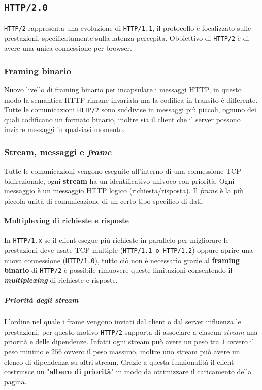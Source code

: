     \subsection{\texttt{HTTP/2.0}}
        \texttt{HTTP/2} rappresenta una evoluzione di \texttt{HTTP/1.1}, il protocollo è focalizzato sulle prestazioni, specificatamente sulla latenza percepita. Obbiettivo di \texttt{HTTP/2} è di avere una unica connessione per browser.
        \subsubsection{Framing binario}
            Nuovo livello di framing binario per incapsulare i messaggi \Acrshort*{HTTP}, in questo modo la semantica \Acrshort*{HTTP} rimane invariata ma la codifica in transito è differente. Tutte le comunicazioni \texttt{HTTP/2} sono suddivise in messaggi più piccoli, ognuno dei quali codificano un formato binario, inoltre sia il client che il server possono inviare messaggi in qualsiasi momento.
        \subsubsection{Stream, messaggi e \textit{frame}}
            Tutte le comunicazioni vengono eseguite all'interno di una connessione \Acrshort*{TCP} bidirezionale, ogni \textbf{stream} ha un identificativo univoco con priorità. Ogni messaggio è un messaggio \Acrshort*{HTTP} logico (richiesta/risposta). Il \textit{frame} è la più piccola unità di comunicazione di un certo tipo specifico di dati.
            \paragraph{Multiplexing di richieste e risposte}
                In \texttt{HTTP/1.x} se il client esegue più richieste in parallelo per migliorare le prestazioni deve usate \Acrshort*{TCP} multiple (\texttt{HTTP/1.1 o HTTP/1.2}) oppure aprire una nuova connessione (\texttt{HTTP/1.0}), tutto ciò non è necessario grazie al \textbf{framing binario} di \texttt{HTTP/2} è possibile rimuovere queste limitazioni consentendo il \textit{\textbf{multiplexing}} di richieste e risposte.
                \subparagraph{Priorità degli stream} L'ordine nel quale i frame vengono inviati dal client o dal server influenza le prestazioni, per questo motivo \texttt{HTTP/2} supporta di associare a ciascun \textit{stream} una priorità e delle dipendenze. Infatti ogni stream può avere un peso tra $ 1 $ ovvero il peso minimo e $ 256 $ ovvero il peso massimo, inoltre uno stream può avere un elenco di dipendenza su altri stream. Grazie a questa funzionalità il client costruisce un "\textbf{albero di priorità}" in modo da ottimizzare il caricamento della pagina.
